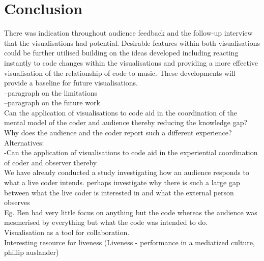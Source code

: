 \documentclass[12pt]{article}
\begin{document}
\section{Conclusion}

There was indication throughout audience feedback and the follow-up interview that the visualisations had potential. Desirable features within both visualisations could be further utilised building on the ideas developed including reacting instantly to code changes within the visualisations and providing a more effective visualisation of the relationship of code to music. These developments will provide a baseline for future visualisations. \\







--paragraph on the limitations\\

--paragraph on the future work\\





Can the application of visualisations to code aid in the coordination of the mental model of the coder and audience thereby reducing the knowledge gap?\\

Why does the audience and the coder report such a different experience?\\

Alternatives:\\
-Can the application of visualisations to code aid in the experiential coordination of coder and observer thereby\\


We have already conducted a study investigating how an audience responds to what a live coder intends. perhaps investigate why there is such a large gap between what the live coder is interested in and what the external person observes\\

Eg. Ben had very little focus on anything but the code whereas the audience was mesmerised by everything but what the code was intended to do.\\

Visualisation as a tool for collaboration.\\


Interesting resource for liveness (Liveness - performance in a mediatized culture, phillip auslander)\\
\end{document}
